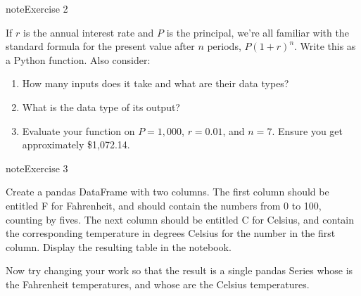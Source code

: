 \documentclass[letterpaper,10pt,english]{jupyterBook}
\begin{document}
\begin{sphinxadmonition}{note}{Exercise 2}

\sphinxAtStartPar
If \(r\) is the annual interest rate and \(P\) is the principal, we’re all familiar with the standard formula for the present value after \(n\) periods, \(P(1+r)^n\).  Write this as a Python function.  Also consider:
\begin{enumerate}
%
\item {} 
\sphinxAtStartPar
How many inputs does it take and what are their data types?

\item {} 
\sphinxAtStartPar
What is the data type of its output?

\item {} 
\sphinxAtStartPar
Evaluate your function on \(P=1,000\), \(r=0.01\), and \(n=7\).  Ensure you get approximately \$1,072.14.

\end{enumerate}
\end{sphinxadmonition}

\begin{sphinxadmonition}{note}{Exercise 3}

\sphinxAtStartPar
Create a pandas DataFrame with two columns.  The first column should be entitled F for Fahrenheit, and should contain the numbers from 0 to 100, counting by fives.  The next column should be entitled C for Celsius, and contain the corresponding temperature in degrees Celsius for the number in the first column.  Display the resulting table in the notebook.

\sphinxAtStartPar
Now try changing your work so that the result is a single pandas Series whose  is the Fahrenheit temperatures, and whose  are the Celsius temperatures.
\end{sphinxadmonition}
\end{document}
